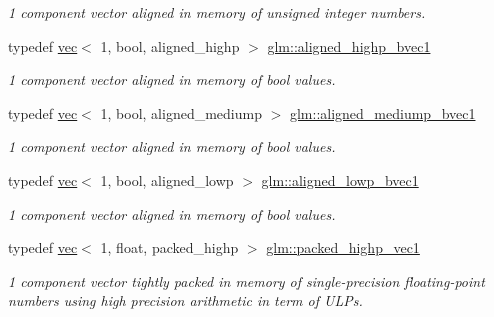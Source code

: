 \begin{DoxyCompactItemize}
\begin{DoxyCompactList}\small\item\em 1 component vector aligned in memory of unsigned integer numbers. \end{DoxyCompactList}\item 
\mbox{\label{group__gtc__type__aligned_ga92b3b4333bdc881b8ae27414162df481}} 
typedef \hyperlink{structglm_1_1vec}{vec}$<$ 1, bool, aligned\+\_\+highp $>$ \hyperlink{group__gtc__type__aligned_ga92b3b4333bdc881b8ae27414162df481}{glm\+::aligned\+\_\+highp\+\_\+bvec1}
\begin{DoxyCompactList}\small\item\em 1 component vector aligned in memory of bool values. \end{DoxyCompactList}\item 
\mbox{\label{group__gtc__type__aligned_gad5720386d2fb75c295f49312284abd13}} 
typedef \hyperlink{structglm_1_1vec}{vec}$<$ 1, bool, aligned\+\_\+mediump $>$ \hyperlink{group__gtc__type__aligned_gad5720386d2fb75c295f49312284abd13}{glm\+::aligned\+\_\+mediump\+\_\+bvec1}
\begin{DoxyCompactList}\small\item\em 1 component vector aligned in memory of bool values. \end{DoxyCompactList}\item 
\mbox{\label{group__gtc__type__aligned_ga188725767d0c2d0331f89574c543e600}} 
typedef \hyperlink{structglm_1_1vec}{vec}$<$ 1, bool, aligned\+\_\+lowp $>$ \hyperlink{group__gtc__type__aligned_ga188725767d0c2d0331f89574c543e600}{glm\+::aligned\+\_\+lowp\+\_\+bvec1}
\begin{DoxyCompactList}\small\item\em 1 component vector aligned in memory of bool values. \end{DoxyCompactList}\item 
\mbox{\label{group__gtc__type__aligned_ga0356e10a8b10f699cf7cf4308f449c83}} 
typedef \hyperlink{structglm_1_1vec}{vec}$<$ 1, float, packed\+\_\+highp $>$ \hyperlink{group__gtc__type__aligned_ga0356e10a8b10f699cf7cf4308f449c83}{glm\+::packed\+\_\+highp\+\_\+vec1}
\begin{DoxyCompactList}\small\item\em 1 component vector tightly packed in memory of single-\/precision floating-\/point numbers using high precision arithmetic in term of U\+L\+Ps. \end{DoxyCompactList}\item 

\end{DoxyCompactItemize}
